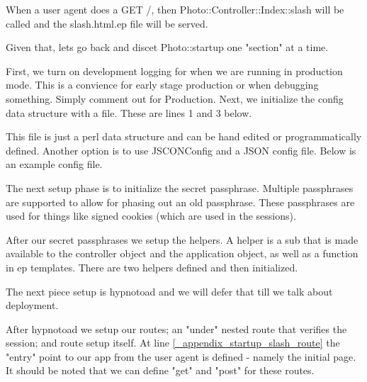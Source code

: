 \documentclass[14pt]{extreport}
\newcommand\Small{\fontsize{10}{10.2}\selectfont}
\newcommand*\LSTfont{\Small\ttfamily\SetTracking{encoding=*}{-60}\lsstyle}
\begin{document}
When a user agent does a GET /, then Photo::Controller::Index::slash will be
called and the slash.html.ep file will be served.



Given that, lets go back and discet Photo::startup one "section" at a time.

First, we turn on development logging for when we are running in production
mode.  This is a convience for early stage production or when debugging
something.  Simply comment out for Production.  Next, we initialize the
config data structure with a file.  These are lines 1 and 3 below.



This file is just a perl data structure and can be hand edited or
programmatically defined.  Another option is to use JSCONConfig and a JSON
config file.  Below is an example config file.



The next setup phase is to initialize the secret passphrase.  Multiple
passphrases are supported to allow for phasing out an old passphrase.  These
passphrases are used for things like signed cookies (which are used in the
sessions).



After our secret passphrases we setup the helpers.  A helper is a sub that is
made available to the controller object and the application object, as well as
a function in ep templates.  There are two helpers defined and then
initialized.



The next piece setup is hypnotoad and we will defer that till we talk about
deployment.

After hypnotoad we setup our routes; an "under" nested route that verifies the
session; and route setup itself.  At line \ref{_appendix_startup_slash_route}
the "entry" point to our app from the user agent is defined - namely the
initial page.  It should be noted that we can define "get" and "post" for these
routes.  


\end{document}
